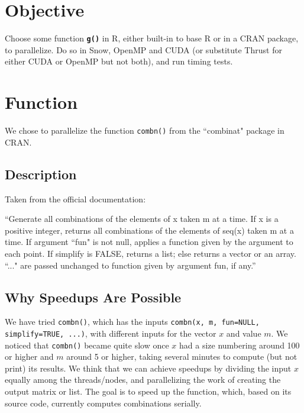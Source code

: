 \documentclass[12pt]{article}
\begin{document}
\raggedright{



\tableofcontents

\newpage


\section{Objective}
Choose some function \textbf{\texttt{g()}} in R, either built-in to base R or in a CRAN package, to parallelize. Do so in Snow, OpenMP and CUDA (or substitute Thrust for either CUDA or OpenMP but not both), and run timing tests.

\section{Function}
We chose to parallelize the function \texttt{combn()} from the ``combinat" package in CRAN.
\subsection{Description}
Taken from the official documentation:\cite{crandoc}\\
\null
\begin{adjustwidth}{2em}{0pt}
``Generate all combinations of the elements of x taken m at a time. If x is a positive integer, returns
all combinations of the elements of seq(x) taken m at a time. If argument ``fun" is not null, applies
a function given by the argument to each point. If simplify is FALSE, returns a list; else returns a
vector or an array. ``..." are passed unchanged to function given by argument fun, if any.''
\end{adjustwidth}

\subsection{Why Speedups Are Possible}

We have tried \texttt{combn()}, which has the inputs \texttt{combn(x, m, fun=NULL, simplify=TRUE, ...)}, with different inputs for the vector $x$ and value $m$. We noticed that \texttt{combn()} became quite slow once $x$ had a size numbering around 100 or higher and $m$ around 5 or higher, taking several minutes to compute (but not print) its results. We think that we can achieve speedups by dividing the input $x$ equally among the threads/nodes, and parallelizing the work of creating the output matrix or list. The goal is to speed up the function, which, based on its source code, currently computes combinations serially.    

}
\end{document}

